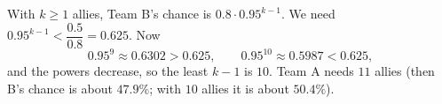 With $k\ge1$ allies, Team B's chance is $0.8\cdot0.95^{k-1}$. We need $0.95^{k-1}<\dfrac{0.5}{0.8}=0.625$. Now
\[0.95^9\approx0.6302>0.625,\qquad0.95^{10}\approx0.5987<0.625,\]
and the powers decrease, so the least $k-1$ is $10$. Team A needs $\boxed{11}$ allies (then B's chance is about $47.9\%$; with $10$ allies it is about $50.4\%$).

